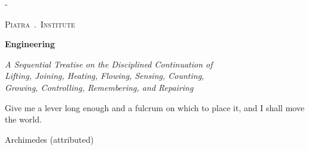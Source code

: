 \begin{titlingpage}
\calccentering{\unitlength}
\begin{adjustwidth*}{\unitlength}{-\unitlength}
\centering

\vspace*{2cm}

{\large\scshape Piatra \,.\, Institute}

\vspace{3cm}

{\Huge\bfseries Engineering}

\vspace{0.8cm}

{\Large\itshape\linespread{1.3}\selectfont
A Sequential Treatise on the Disciplined Continuation of\\
Lifting, Joining, Heating, Flowing, Sensing, Counting,\\
Growing, Controlling, Remembering, and Repairing\par}

\vspace{4cm}

\epigraph{Give me a lever long enough and a fulcrum on which to place it, and I shall move the world.}{Archimedes (attributed)}

\vfill

{\large\the\year}

\end{adjustwidth*}
\end{titlingpage}
